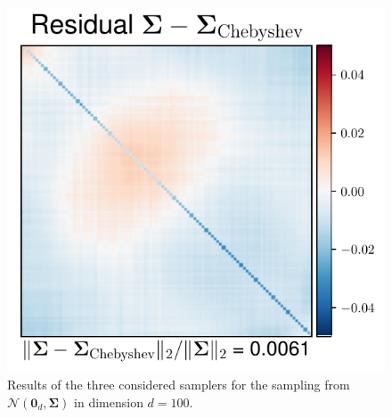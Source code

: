 \documentclass[aspectratio=169]{beamer}
\newcommand{\B}[1]{\mathbf{#1}} %
\begin{document}
\begin{frame}
\begin{figure}
    \mbox{{\includegraphics[scale=0.4]{src/images/simu1_ex1_A_Cheby.pdf}}}
  \caption{Results of the three considered samplers for the sampling from $\mathcal{N}(\B{0}_d,\B{\Sigma})$ in dimension $d = 100$.}
  \end{figure}
\end{frame}
\end{document}
